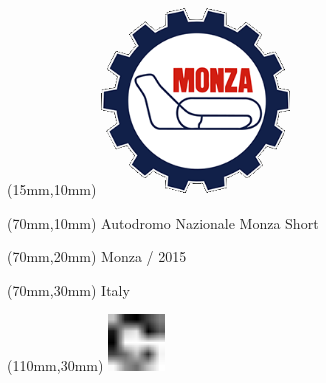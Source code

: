 \null\newpage
\begin{textblock*}{50mm}(15mm,10mm)%
\includegraphics[width=50mm]{LG/MON.png}
\end{textblock*}
\begin{textblock*}{130mm}(70mm,10mm)%
{\fontsize{20}{20}\selectfont Autodromo Nazionale Monza Short}\\
\end{textblock*}
\begin{textblock*}{120mm}(70mm,20mm)%
{\fontsize{16}{16}\selectfont Monza / 2015}\\
\end{textblock*}
\begin{textblock*}{120mm}(70mm,30mm)%
{\fontsize{12}{12}\selectfont Italy}
\end{textblock*}
\begin{textblock*}{30mm}(110mm,30mm)%
\centering
\includegraphics[height=15mm]{icons/fa-rotate-right.pdf}
\end{textblock*}
